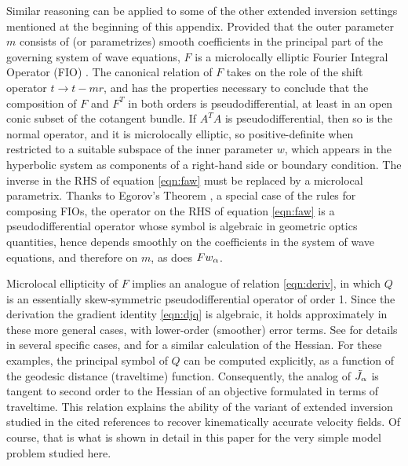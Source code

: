 Similar reasoning can be applied to some of the other extended
inversion settings mentioned at the beginning of this
appendix. Provided that the outer parameter $m$ consists of (or
parametrizes) smooth coefficients in the principal part of the
governing system of wave equations, $F$ is a microlocally elliptic
Fourier Integral Operator (FIO) \cite[]{Dui:95}. The canonical
relation of $F$ takes on the role of the shift operator
$t \rightarrow t-mr$, and has the properties necessary to conclude
that the composition of $F$ and $F^T$ in both orders is
pseudodifferential, at least in an open conic subset of the cotangent
bundle. If $A^TA$ is pseudodifferential, then so is the normal
operator, and it is microlocally elliptic, so positive-definite when
restricted to a suitable subspace of the inner parameter $w$, which
appears in the hyperbolic system as components of a right-hand side or
boundary condition. The inverse in the RHS of equation \ref{eqn:faw}
must be replaced by a microlocal parametrix. Thanks to Egorov's
Theorem \cite[]{Tay:81}, a special case of the rules for composing
FIOs, the operator on the RHS of equation \ref{eqn:faw} is a
pseudodifferential operator whose symbol is algebraic in geometric
optics quantities, hence depends smoothly on the coefficients in the
system of wave equations, and therefore on $m$, as does $Fw_{\alpha}$.

Microlocal ellipticity of $F$ implies an analogue of relation
\ref{eqn:deriv}, in which $Q$ is an essentially skew-symmetric
pseudodifferential operator of order 1. Since the derivation 
the gradient identity \ref{eqn:djq} is algebraic, it holds
approximately in these more general cases, with lower-order (smoother)
error terms. See 
\cite{Symes:Madrid,tenKroode:IPTA14,Symes:IPTA14} for details in
several specific cases, and for a similar calculation of the Hessian.
For these examples, the principal symbol of $Q$ can be computed
explicitly, as a function of the geodesic distance (traveltime)
function. Consequently, the analog of $\tilde{J}_{\alpha}$ is tangent to second
order to the Hessian of an objective formulated in terms of
traveltime. This relation explains the ability of the variant of
extended inversion studied in the cited references to recover
kinematically accurate velocity fields. Of course, that is what is
shown in detail in this paper for the very simple model problem
studied here.
